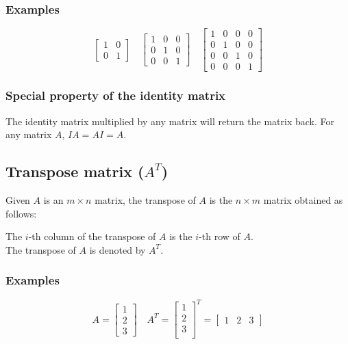 \documentclass[11pt]{article}
\begin{document}
\subsubsection{Examples}
\label{sec:org07d8e91}
\begin{displaymath}
\begin{bmatrix}
1 & 0 \\
0 & 1
\end{bmatrix} \quad \begin{bmatrix}
1 & 0 & 0 \\
0 & 1 & 0 \\
0 & 0 & 1
\end{bmatrix} \quad \begin{bmatrix}
1 & 0 & 0 & 0 \\
0 & 1 & 0 & 0 \\
0 & 0 & 1 & 0 \\
0 & 0 & 0 & 1
\end{bmatrix}
\end{displaymath}

\subsubsection{Special property of the identity matrix}
\label{sec:orgda587f9}
The identity matrix multiplied by any matrix will return the matrix back. For any matrix \(A\), \(IA = AI = A\).

\subsection{Transpose matrix (\(A^T\))}
\label{sec:org2ef71b1}
Given \(A\) is an \(m \times n\) matrix, the transpose of \(A\) is the \(n \times m\) matrix obtained as follows:

The \(i\)-th column of the transpose of \(A\) is the \(i\)-th row of \(A\).
\\[0pt]

The transpose of \(A\) is denoted by \(A^T\).

\subsubsection{Examples}
\label{sec:org78a7c8d}
\begin{displaymath}
A = \begin{bmatrix}
1 \\
2 \\
3
\end{bmatrix} \quad A^{T} = \begin{bmatrix}
1 \\
2 \\
3 \\
\end{bmatrix}^{T} = \begin{bmatrix}
1 & 2 & 3
\end{bmatrix}
\end{displaymath}
\end{document}
